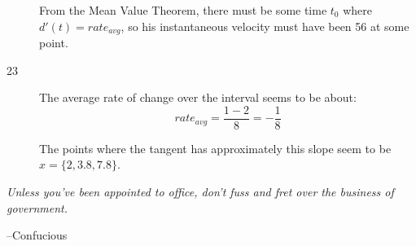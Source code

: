 \documentclass[fleqn]{exam}
\begin{document}
\begin{description}
From the Mean Value Theorem, there must be some time $t_0$ where $d'(t) = rate_{avg}$, so his instantaneous velocity must
have been 56 at some point.

\item[23]
The average rate of change over the interval seems to be about:
\[
  rate_{avg} = \frac{1 - 2}{8} = - \frac{1}{8}
\]

The points where the tangent has approximately this slope seem to be $x = \{2, 3.8, 7.8 \}$.

\end{description}

\else

\vspace{5 cm}



{\em Unless you've been appointed to office, don't fuss and fret over the business of government.}
\vspace{.2 cm}

\hspace{1 cm} --Confucious

\fi
\end{document}
